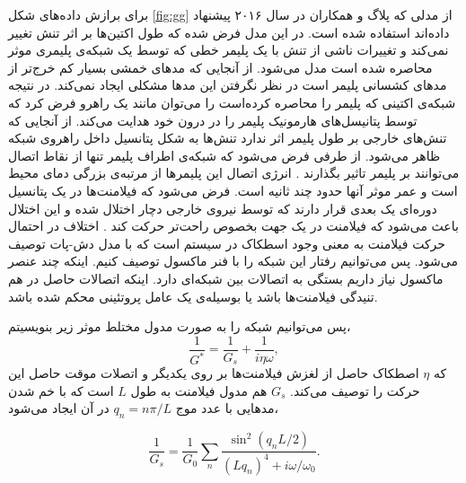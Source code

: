 برای برازش داده‌های شکل  \ref{fig:gg} از مدلی که پلاگ و همکاران در سال ۲۰۱۶ پیشنهاد داده‌اند استفاده شده است. در این مدل فرض شده که طول اکتین‌ها بر اثر تنش تغییر نمی‌کند و تغییرات ناشی از تنش با یک پلیمر خطی که توسط یک شبکه‌ی  پلیمری موثر محاصره شده است مدل می‌شود. از آنجایی که مد‌های خمشی بسیار کم خرج‌تر از مد‌های کشسانی‌ پلیمر است در نظر نگرفتن این مدها مشکلی ایجاد نمی‌کند. در نتیجه  شبکه‌ی اکتینی که پلیمر را محاصر‌ه کرده‌است را می‌توان مانند یک راهرو فرض کرد که توسط پتانیسل‌های هارمونیک پلیمر را در درون خود هدایت می‌کند. از آنجایی که تنش‌های خارجی بر طول پلیمر اثر ندارد تنش‌ها به شکل پتانسیل داخل راهروی شبکه ظاهر می‌شود. از طرفی فرض می‌شود که شبکه‌ی اطراف پلیمر تنها از نقاط اتصال می‌توانند بر پلیمر تاثیر بگذارند \cite{doi:10.1063/1.5030169, PhysRevE.93.062502}. انرژی اتصال این پلیمر‌ها از مرتبه‌ی بزرگی دمای محیط است و عمر موثر آنها حدود چند ثانیه ‌است.\cite{doi:10.1021/acs.jpcb.7b11491} فرض می‌شود که فیلامنت‌ها در یک پتانسیل دوره‌ای یک بعدی قرار دارند که توسط نیروی خارجی دچار اختلال شده و این اختلال باعث می‌شود که فیلامنت در یک جهت بخصوص راحت‌تر حرکت کند \cite{PhysRevE.93.062502}. اختلاف در احتمال حرکت فیلامنت به معنی وجود اسطکاک در سیستم است که با مدل دش-پات توصیف می‌شود. پس می‌توانیم رفتار این شبکه را با فنر ماکسول توصیف کنیم. اینکه چند عنصر ماکسول نیاز داریم بستگی به اتصالات بین شبکه‌ای دارد. اینکه اتصالات حاصل در هم تنیدگی فیلامنت‌ها باشد یا بوسیله‌ی یک عامل پروتئینی محکم شده باشد.


پس می‌توانیم شبکه را به صورت مدول مختلط موثر زیر بنویسیتم،
\begin{equation}
\frac{1}{G^*}=\frac{1}{G_s}+\frac{1}{i\eta\omega},
\end{equation}
که $\eta$ اصطکاک حاصل از لغزش فیلامنت‌ها بر روی یکدیگر و اتصلات موقت حاصل این حرکت را توصیف می‌کند. $G_s$ هم مدول فیلامنت به طول $L$ است که با خم‌ شدن مدهایی با عدد موج $q_n=n\pi/L$ در آن ایجاد می‌شود،


\begin{equation}
\frac{1}{G_s}=\frac{1}{G_0}\sum_n\frac{\sin^2(q_nL/2)}{(Lq_n)^4+i\omega/\omega_0}.
\label{eq:Gs}
\end{equation}


